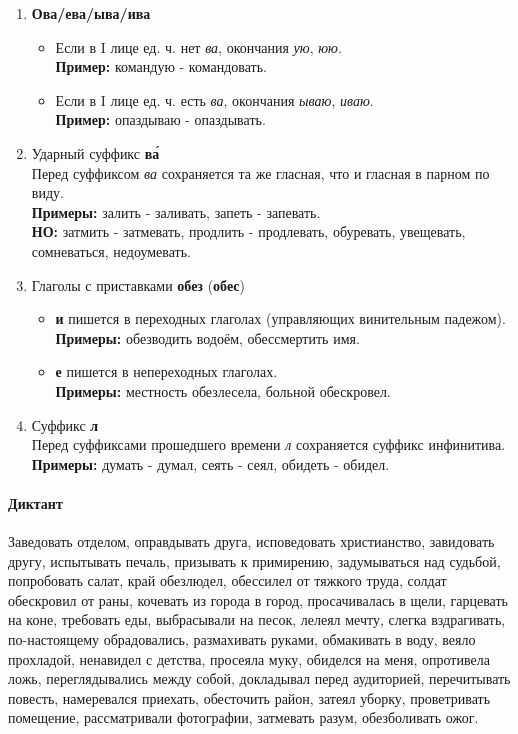 \documentclass{article}
\begin{document}
\begin{enumerate}
\item
  \textbf{Ова/ева/ыва/ива}
  \begin{itemize}
  \item
    Если в I лице ед. ч. нет \emph{ва}, окончания \emph{ую}, \emph{юю}.\\
    \textbf{Пример:} командую - командовать.
  \item
    Если в I лице ед. ч. есть \emph{ва}, окончания \emph{ываю}, \emph{иваю}.\\
    \textbf{Пример:} опаздываю - опаздывать.
  \end{itemize}
\item
  Ударный суффикс \textbf{в\'{а}}\\
  Перед суффиксом \emph{ва} сохраняется та же гласная, что и гласная в парном по виду.\\
  \textbf{Примеры:} залить - заливать, запеть - запевать.\\
  \textbf{НО:} затмить - затмевать, продлить - продлевать, обуревать, увещевать, сомневаться, недоумевать.
\item
  Глаголы с приставками \textbf{обез} (\textbf{обес})
  \begin{itemize}
  \item
    \textbf{и} пишется в переходных глаголах (управляющих винительным падежом).\\
    \textbf{Примеры:} обезводить водоём, обессмертить имя.
  \item
    \textbf{е} пишется в непереходных глаголах.\\
    \textbf{Примеры:} местность обезлесела, больной обескровел.
  \end{itemize}
\item
  Суффикс \textbf{л}\\
  Перед суффиксами прошедшего времени \emph{л} сохраняется суффикс инфинитива.\\
  \textbf{Примеры:} думать - думал, сеять - сеял, обидеть - обидел.
\end{enumerate}

\paragraph{Диктант}
Заведовать отделом, оправдывать друга, исповедовать христианство, завидовать другу,
испытывать печаль, призывать к примирению, задумываться над судьбой, попробовать салат,
край обезлюдел, обессилел от тяжкого труда, солдат обескровил от раны, кочевать из города в город,
просачивалась в щели, гарцевать на коне, требовать еды, выбрасывали на песок,
лелеял мечту, слегка вздрагивать, по-настоящему обрадовались, размахивать руками,
обмакивать в воду, веяло прохладой, ненавидел с детства, просеяла муку,
обиделся на меня, опротивела ложь, переглядывались между собой, докладывал перед аудиторией,
перечитывать повесть, намеревался приехать, обесточить район, затеял уборку,
проветривать помещение, рассматривали фотографии, затмевать разум, обезболивать ожог.
\end{document}
